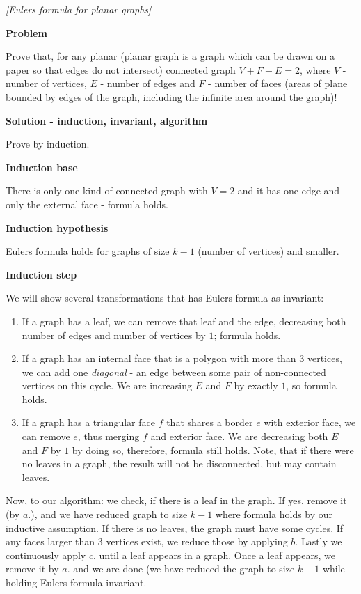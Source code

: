 \begin{problem}
\textit{[Eulers formula for planar graphs]}

\textbf{Problem}

Prove that, for any planar (planar graph is a graph which can be drawn on a paper so that edges do not intersect) connected graph $V+F-E=2$, where $V$ - number of vertices, $E$ - number of edges and $F$ - number of faces (areas of plane bounded by edges of the graph, including the infinite area around the graph)!

\textbf{Solution - induction, invariant, algorithm}

Prove by induction. 

\textbf{Induction base}

There is only one kind of connected graph with $V=2$ and it has one edge and only the external face - formula holds.

\textbf{Induction hypothesis}

Eulers formula holds for graphs of size $k-1$ (number of vertices) and smaller.

\textbf{Induction step}

We will show several transformations that has Eulers formula as invariant:
\begin{enumerate}
\item If a graph has a leaf, we can remove that leaf and the edge, decreasing both number of edges and number of vertices by $1$; formula holds.
\item If a graph has an internal face that is a polygon with more than $3$ vertices, we can add one \textit{diagonal} - an edge between some pair of non-connected vertices on this cycle. We are increasing $E$ and $F$ by exactly $1$, so formula holds.
\item If a graph has a triangular face $f$ that shares a border $e$ with exterior face, we can remove $e$, thus merging $f$ and exterior face. We are decreasing both $E$ and $F$ by $1$ by doing so, therefore, formula still holds. Note, that if there were no leaves in a graph, the result will not be disconnected, but may contain leaves.
\end{enumerate}

Now, to our algorithm: we check, if there is a leaf in the graph. If yes, remove it (by $a$.), and we have reduced graph to size $k-1$ where formula holds by our inductive assumption.
If there is no leaves, the graph must have some cycles. If any faces larger than $3$ vertices exist, we reduce those by applying $b$. 
Lastly we continuously apply $c$. until a leaf appears in a graph. Once a leaf appears, we remove it by $a.$ and we are done (we have reduced the graph to size $k-1$ while holding Eulers formula invariant.
\end{problem}

